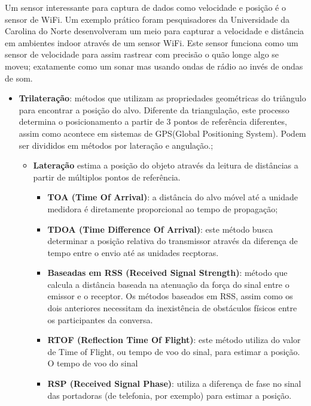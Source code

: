 Um sensor interessante para captura de dados como velocidade e posição é o sensor de WiFi. Um exemplo prático foram pesquisadores da Universidade da Carolina do Norte desenvolveram um meio para capturar a velocidade e distância em ambientes indoor através de um sensor WiFi. Este sensor funciona como um sensor de velocidade para assim rastrear com precisão o quão longe algo se moveu; exatamente como um sonar mas usando ondas de rádio ao invés de ondas de som.
\cite{Diego2016}

\begin{itemize}

    \item \textbf{Trilateração}: métodos que utilizam as propriedades geométricas do triângulo para encontrar a posição do alvo. Diferente da triangulação, este processo determina o posicionamento a partir de 3 pontos de referência diferentes, assim como acontece em sistemas de GPS(Global Positioning System). Podem ser divididos em métodos por lateração e angulação.;
    
    \begin{itemize}
        \item \textbf{Lateração} estima a posição do objeto através da leitura de distâncias a partir de múltiplos pontos de referência.
        
        \begin{itemize}
            \item \textbf{TOA (Time Of Arrival)}: a distância do alvo móvel até a unidade medidora
            é diretamente proporcional ao tempo de propagação; 
            \item \textbf{TDOA (Time Difference Of Arrival)}: este método busca determinar a posição relativa do transmissor através da diferença de tempo entre o envio até as unidades recptoras.
            \item \textbf{Baseadas em RSS (Received Signal Strength)}: método que calcula a distância baseada na atenuação da força do sinal entre o emissor e o receptor. Os métodos baseados em RSS, assim como os dois anteriores necessitam da inexistência de obstáculos físicos entre os participantes da conversa.
            \item \textbf{RTOF (Reflection Time Of Flight)}: este método utiliza do valor de Time of Flight, ou tempo de voo do sinal, para estimar a posição. O tempo de voo do sinal 
            \item \textbf{RSP (Received Signal Phase)}: utiliza a diferença de fase no sinal das portadoras (de telefonia, por exemplo) para estimar a posição.
        \end{itemize}


\end{itemize}
\end{itemize}
